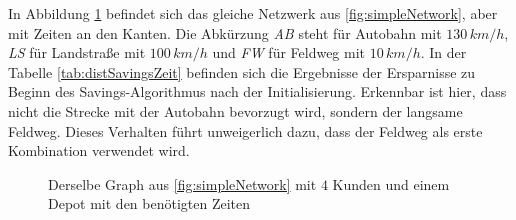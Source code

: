 \noindent
In Abbildung \ref{fig:simpleNetworkTime} befindet sich das gleiche Netzwerk aus \ref{fig:simpleNetwork}, aber mit Zeiten an den Kanten. 
Die Abkürzung \textit{AB} steht für Autobahn mit $130\,km/h$, \textit{LS} für Landstraße mit $100\,km/h$ und \textit{FW} für Feldweg mit $10\,km/h$. 
In der Tabelle \ref{tab:distSavingsZeit} befinden sich die Ergebnisse der Ersparnisse zu Beginn des Savings-Algorithmus nach der Initialisierung.
Erkennbar ist hier, dass nicht die Strecke mit der Autobahn bevorzugt wird, sondern der langsame Feldweg. 
Dieses Verhalten führt unweigerlich dazu, dass der Feldweg als erste Kombination verwendet wird. 
\begin{figure}
\centering
{}

	\caption{Derselbe Graph aus \ref{fig:simpleNetwork} mit $4$ Kunden und einem Depot mit den benötigten Zeiten}
	\label{fig:simpleNetworkTime}
\end{figure}
